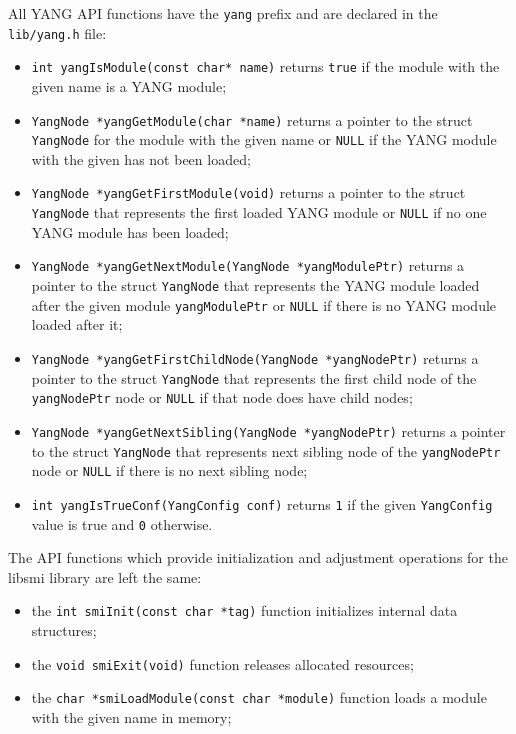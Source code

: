 \documentclass[conference]{IEEEtran}
\begin{document}
All YANG API functions have the \texttt{yang} prefix and are declared in the \texttt{lib/yang.h} file:
\begin{itemize}
\item \texttt{int yangIsModule(const char* name)} returns \texttt{true} if the module with the given name is a YANG module;
\item \texttt{YangNode *yangGetModule(char *name)} returns a pointer to the struct \texttt{YangNode} for the module with the given name or \texttt{NULL} if the YANG module with the given has not been loaded;
\item \texttt{YangNode *yangGetFirstModule(void)} returns a pointer to the struct \texttt{YangNode} that represents the first loaded YANG module or \texttt{NULL} if no one YANG module has been loaded;
\item \texttt{YangNode *yangGetNextModule(YangNode *yangModulePtr)} returns a pointer to the struct \texttt{YangNode} that represents the YANG module loaded after the given module \texttt{yangModulePtr} or \texttt{NULL} if there is no YANG module loaded after it;
\item \texttt{YangNode *yangGetFirstChildNode(YangNode *yangNodePtr)} returns a pointer to the struct \texttt{YangNode} that represents the first child node of the \texttt{yangNodePtr} node or \texttt{NULL} if that node does have child nodes;
\item \texttt{YangNode *yangGetNextSibling(YangNode *yangNodePtr)} returns a pointer to the struct \texttt{YangNode} that represents next sibling node of the \texttt{yangNodePtr} node or \texttt{NULL} if there is no next sibling node;
\item \texttt{int yangIsTrueConf(YangConfig conf)} returns \texttt{1} if the given \texttt{YangConfig} value is true and \texttt{0} otherwise.
\end{itemize}

The API functions which provide initialization and adjustment operations for the libsmi library are left the same:
\begin{itemize}
\item the \texttt{int smiInit(const char *tag)} function initializes internal data structures;
\item the \texttt{void smiExit(void)} function releases allocated resources;
\item the \texttt{char *smiLoadModule(const char *module)} function loads a module with the given name in memory;
\end{itemize}
\end{document}

